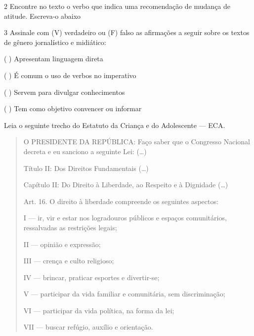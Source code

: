{

\num{2} Encontre no texto o verbo que indica uma recomendação de mudança de atitude.
Escreva-o abaixo


\num{3} Assinale com (V) verdadeiro ou (F) falso as afirmações a seguir sobre os textos
de gênero jornalístico e midiático:

\begin{itemize}

( ) Apresentam linguagem direta

( ) É comum o uso de verbos no imperativo

( ) Servem para divulgar conhecimentos

( ) Tem como objetivo convencer ou informar

\end{itemize}


Leia o seguinte trecho do Estatuto da Criança e do Adolescente --- ECA.

\begin{quote}
O PRESIDENTE DA REPÚBLICA: Faço saber que o Congresso Nacional decreta e
eu sanciono a seguinte Lei: (\ldots{})

Título II: Dos Direitos Fundamentais (\ldots{})

Capítulo II: Do Direito à Liberdade, ao Respeito e à Dignidade (\ldots{})

Art. 16. O direito à liberdade compreende os seguintes aspectos:

I --- ir, vir e estar nos logradouros públicos e espaços comunitários,
ressalvadas as restrições legais;

II --- opinião e expressão;

III --- crença e culto religioso;

IV --- brincar, praticar esportes e divertir-se;

V --- participar da vida familiar e comunitária, sem discriminação;

VI --- participar da vida política, na forma da lei;

VII --- buscar refúgio, auxílio e orientação. \\


\end{quote}}
